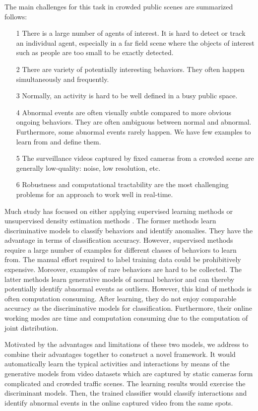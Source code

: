 The main challenges for this task in crowded public scenes are summarized follows: 
\begin{itemize}
	\item[1] There is a large number of agents of interest. It is hard to detect or track an individual agent, especially in a far field scene where the objects of interest such as people are too small to be exactly detected.
	\item[2] There are variety of potentially interesting behaviors. They often happen simultaneously and frequently.
	\item[3] Normally, an activity is hard to be well defined in a busy public space. 
	\item[4] Abnormal events are often visually subtle compared to more obvious ongoing behaviors. They are often ambiguous between normal and abnormal. Furthermore, some abnormal events rarely happen. We have few examples to learn from and define them.
	\item[5] The surveillance videos captured by fixed cameras from a crowded scene are generally low-quality: noise, low resolution, etc.
	\item[6] Robustness and computational tractability are the most challenging problems for an approach to work well in real-time.
\end{itemize}

Much study has focused on either applying supervised learning methods \cite{altun2004gaussian, robertson2006general} or unsupervised density estimation methods \cite{wang2009unsupervised, li2008global}. The former methods learn discriminative models to classify behaviors and identify anomalies. They have the advantage in terms of classification accuracy. However, supervised methods require a large number of examples for different classes of behaviors to learn from. The manual effort required to label training data could be prohibitively expensive. Moreover, examples of rare behaviors are hard to be collected. The latter methods learn generative models of normal behavior and can thereby potentially identify abnormal events as outliers. However, this kind of methods is often computation consuming. After learning, they do not enjoy comparable accuracy as the discriminative models for classification. Furthermore, their online working modes are time and computation consuming due to the computation of joint distribution.

Motivated by the advantages and limitations of these two models, we address to combine their advantages together to construct a novel framework. It would automatically learn the typical activities and interactions by means of the generative models from  video datasets which are captured by static cameras form complicated and crowded traffic scenes. The learning results would exercise the discriminant models. Then, the trained classifier would classify interactions and identify abnormal events in the online captured video from the same spots.


